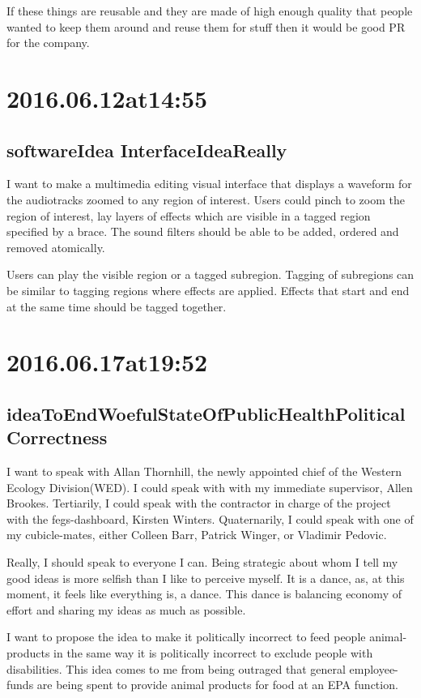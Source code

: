If these things are reusable and they are made of high enough quality that people wanted to keep them around and reuse them for stuff then it would be good PR for the company.

\section*{ 2016.06.12at14:55 }
\subsection*{softwareIdea InterfaceIdeaReally}
I want to make a multimedia editing visual interface that displays a waveform for the audiotracks zoomed to any region of interest. Users could pinch to zoom the region of interest, lay layers of effects which are visible in a tagged region specified by a brace. The sound filters should be able to be added, ordered and removed atomically.

Users can play the visible region or a tagged subregion. Tagging of subregions can be similar to tagging regions where effects are applied. Effects that start and end at the same time should be tagged together.

\section*{ 2016.06.17at19:52 }
\subsection*{ideaToEndWoefulStateOfPublicHealthPoliticalCorrectness}
I want to speak with Allan Thornhill, the newly appointed chief of the Western Ecology Division(WED). I could speak with with my immediate supervisor, Allen Brookes. Tertiarily, I could speak with the contractor in charge of the project with the fegs-dashboard, Kirsten Winters. Quaternarily, I could speak with one of my cubicle-mates, either Colleen Barr, Patrick Winger, or Vladimir Pedovic.

Really, I should speak to everyone I can. Being strategic about whom I tell my good ideas is more selfish than I like to perceive myself. It is a dance, as, at this moment, it feels like everything is, a dance. This dance is balancing economy of effort and sharing my ideas as much as possible.

I want to propose the idea to make it politically incorrect to feed people animal-products in the same way it is politically incorrect to exclude people with disabilities. This idea comes to me from being outraged that general employee-funds are being spent to provide animal products for food at an EPA function.

